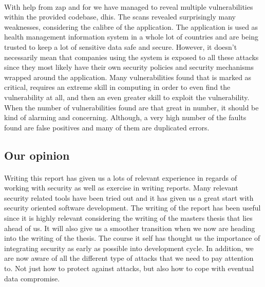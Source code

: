 \documentclass[11pt,english,a4paper]{report}
\begin{document}
\paragraph{}
With help from \gls{zap} and \gls{for} we have managed to reveal multiple vulnerabilities within the provided codebase, \gls{dhis}.
The scans revealed surprisingly many weaknesses, considering the calibre of the application.
The application is used as health management information system in a whole lot of countries and are being trusted to keep a lot of sensitive data safe and secure.
However, it doesn't necessarily mean that companies using the system is exposed to all these attacks since they most likely have their own security policies and security mechanisms wrapped around the application. 
Many vulnerabilities found that is marked as critical, requires an extreme skill in computing in order to even find the vulnerability at all, and then an even greater skill to exploit the vulnerability.
When the number of vulnerabilities found are that great in number, it should be kind of alarming and concerning.
Although, a very high number of the faults found are false positives and many of them are duplicated errors.

\subsection{Our opinion}
\paragraph{}
Writing this report has given us a lots of relevant experience in regards of working with security as well as exercise in writing reports.
Many relevant security related tools have been tried out and it has given us a great start with security oriented software development.
The writing of the report has been useful since it is highly relevant considering the writing of the masters thesis that lies ahead of us.
It will also give us a smoother transition when we now are heading into the writing of the thesis.
The course it self has thought us the importance of integrating security as early as possible into development cycle.
In addition, we are now aware of all the different type of attacks that we need to pay attention to.
Not just how to protect against attacks, but also how to cope with eventual data compromise.


\newpage




\end{document}
